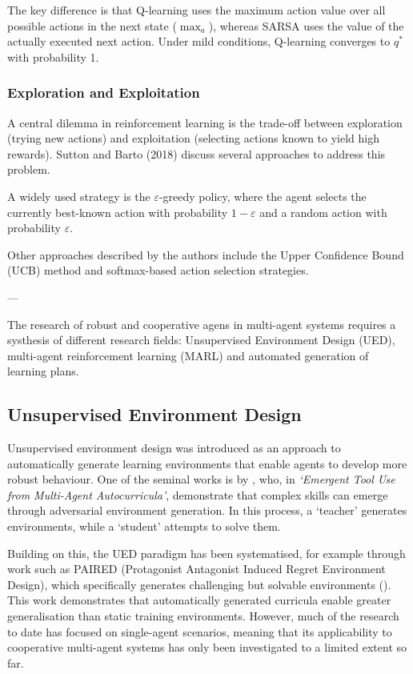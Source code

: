 The key difference is that Q-learning uses the maximum action value over all possible actions in the next state (\(\max_a\)), whereas SARSA uses the value of the actually executed next action. Under mild conditions, Q-learning converges to \(q^*\) with probability 1.

\subsubsection{Exploration and Exploitation}

A central dilemma in reinforcement learning is the trade-off between exploration (trying new actions) and exploitation (selecting actions known to yield high rewards). Sutton and Barto (2018) discuss several approaches to address this problem.

A widely used strategy is the \(\varepsilon\)-greedy policy, where the agent selects the currently best-known action with probability \(1 - \varepsilon\) and a random action with probability \(\varepsilon\).

Other approaches described by the authors include the Upper Confidence Bound (UCB) method and softmax-based action selection strategies.


---


The research of robust and cooperative agens in multi-agent systems requires a systhesis of different  research fields: Unsupervised Environment Design (UED), multi-agent reinforcement learning (MARL) and automated generation of learning plans.


\subsection*{Unsupervised Environment Design}
Unsupervised environment design was introduced as an approach to automatically generate learning environments that enable agents to develop more robust behaviour. One of the seminal works is by \cite{baker2020}, who, in \emph{‘Emergent Tool Use from Multi-Agent Autocurricula’}, demonstrate that complex skills can emerge through adversarial environment generation. In this process, a ‘teacher’ generates environments, while a ‘student’ attempts to solve them.

Building on this, the UED paradigm has been systematised, for example through work such as PAIRED (Protagonist Antagonist Induced Regret Environment Design), which specifically generates challenging but solvable environments (\cite{dennis2020}). This work demonstrates that automatically generated curricula enable greater generalisation than static training environments. However, much of the research to date has focused on single-agent scenarios, meaning that its applicability to cooperative multi-agent systems has only been investigated to a limited extent so far.


